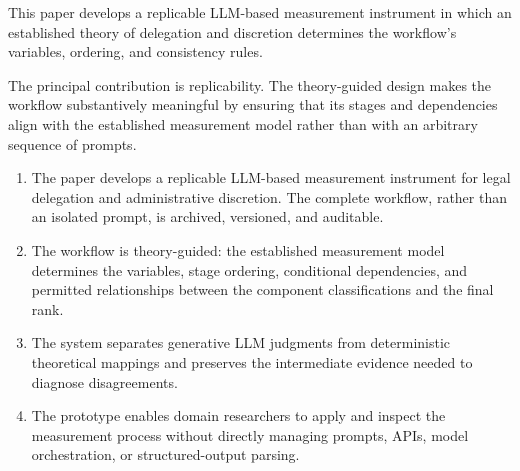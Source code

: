
This paper develops a replicable LLM-based measurement instrument
in which an established theory of delegation and discretion
determines the workflow's variables, ordering, and consistency rules.



The principal contribution is replicability. The theory-guided
design makes the workflow substantively meaningful by ensuring that 
its stages and dependencies align with the established measurement
model rather than with an arbitrary sequence of prompts.



\begin{enumerate}
    \item The paper develops a replicable LLM-based measurement
    instrument for legal delegation and administrative discretion.
    The complete workflow, rather than an isolated prompt, is
    archived, versioned, and auditable.

    \item The workflow is theory-guided: the established measurement
    model determines the variables, stage ordering, conditional
    dependencies, and permitted relationships between the component
    classifications and the final rank.

    \item The system separates generative LLM judgments from
    deterministic theoretical mappings and preserves the intermediate
    evidence needed to diagnose disagreements.

    \item The prototype enables domain researchers to apply and inspect
    the measurement process without directly managing prompts, APIs,
    model orchestration, or structured-output parsing.
\end{enumerate}


